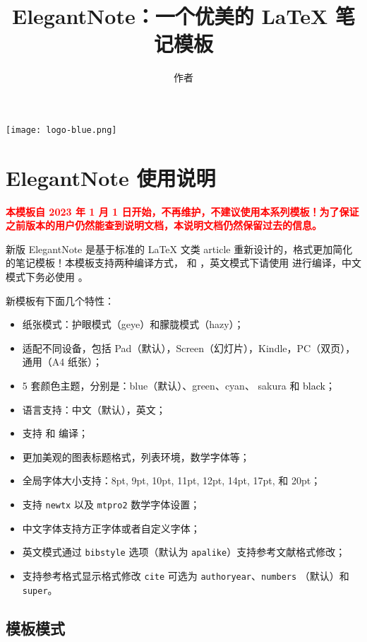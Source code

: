 \documentclass[cn,hazy,blue,14pt,screen]{elegantnote}
\title{ElegantNote：一个优美的 \LaTeX{} 笔记模板}
\author{作者}
\institute{Elegant\LaTeX{} Program}
\date{\zhtoday}
\begin{document}
\maketitle

\centerline{
  \texttt{[image: logo-blue.png]}
}

\section{ElegantNote 使用说明}

\textbf{\textcolor{red}{本模板自 2023 年 1 月 1 日开始，不再维护，不建议使用本系列模板！为了保证之前版本的用户仍然能查到说明文档，本说明文档仍然保留过去的信息。}}

新版 ElegantNote 是基于标准的 \LaTeX{} 文类 article 重新设计的，格式更加简化的笔记模板！本模板支持两种编译方式， 和 ，英文模式下请使用  进行编译，中文模式下务必使用 。

新模板有下面几个特性：

\begin{itemize}
  \item 纸张模式：护眼模式（geye）和朦胧模式（hazy）；
  \item 适配不同设备，包括 Pad（默认），Screen（幻灯片），Kindle，PC（双页），通用（A4 纸张）；
  \item 5 套颜色主题，分别是：\textcolor{eblue}{blue}（默认）、\textcolor{egreen}{green}、\textcolor{ecyan}{cyan}、 \textcolor{sakura}{sakura} 和 \textcolor{black}{black}；
  \item 语言支持：中文（默认），英文；
  \item 支持  和  编译；
  \item 更加美观的图表标题格式，列表环境，数学字体等；
  \item 全局字体大小支持：8pt, 9pt, 10pt, 11pt, 12pt, 14pt, 17pt, 和 20pt；
  \item 支持 \lstinline{newtx} 以及 \lstinline{mtpro2} 数学字体设置； 
  \item 中文字体支持方正字体或者自定义字体；
  \item 英文模式通过 \lstinline{bibstyle} 选项（默认为 \lstinline{apalike}）支持参考文献格式修改；
  \item 支持参考格式显示格式修改 \lstinline{cite} 可选为 \lstinline{authoryear}、\lstinline{numbers} （默认）和 \lstinline{super}。
\end{itemize}

\subsection{模板模式}
\end{document}
